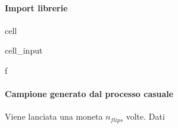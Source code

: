 \documentclass[letterpaper,10pt,italian]{jupyterBook}
\begin{document}
\paragraph{Import librerie}
\label{\detokenize{ch/statistics/test-fisher-coin-1:import-librerie}}
\begin{sphinxuseclass}{cell}\begin{sphinxVerbatimInput}

\begin{sphinxuseclass}{cell_input}
\begin{sphinxVerbatim}[commandchars=\\\{\}]
 \PYGZhy{}f
   
   

   
\end{sphinxVerbatim}

\end{sphinxuseclass}\end{sphinxVerbatimInput}

\end{sphinxuseclass}

\paragraph{Campione generato dal processo casuale}
\label{\detokenize{ch/statistics/test-fisher-coin-1:campione-generato-dal-processo-casuale}}
\sphinxAtStartPar
Viene lanciata una moneta \(n_{flips}\) volte. Dati
\end{document}
